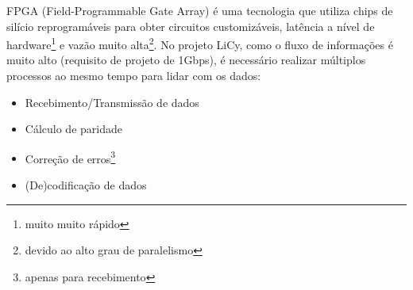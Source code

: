 	FPGA (Field-Programmable Gate Array) é uma tecnologia que utiliza chips de silício reprogramáveis para obter circuitos customizáveis, latência a nível de hardware\footnote{muito muito rápido} e vazão muito alta\footnote{devido ao alto grau de paralelismo}. No projeto LiCy, como o fluxo de informações é muito alto (requisito de projeto de 1Gbps), é necessário realizar múltiplos processos ao mesmo tempo para lidar com os dados:
	
	\begin{itemize}  
		\item Recebimento/Transmissão de dados
		\item Cálculo de paridade
		\item Correção de erros\footnote{apenas para recebimento}
		\item (De)codificação de dados
	\end{itemize}
	
